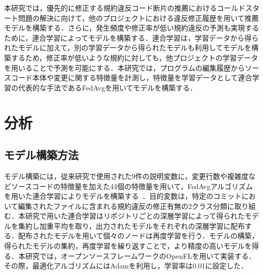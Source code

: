 \documentclass[uplatex,dvipdfmx,a4paper,twocolumn,base=11pt,jbase=11pt,ja=standard]{bxjsarticle}  %
\newcommand{\todo}[1]{\colorbox{yellow}{{\bf TODO}:}{\color{red} {\textbf{[#1]}}}}
\begin{document}
本研究では，優先的に修正する規約違反コード断片の推薦におけるコールドスタート問題の解決に向けて，他のプロジェクトにおける違反修正履歴を用いて推薦モデルを構築する．さらに，発生頻度や修正率が低い規約違反の予測も実現するために，連合学習によってモデルを構築する．連合学習は，学習データから得られたモデルに加えて，別の学習データから得られたモデルも利用してモデルを構築するため，修正率が低いような規約に対しても，他プロジェクトの学習データを用いることで予測を可能にする．本研究では，プログラムの編集履歴からソースコード本体や変更に関する特徴量を計測し，特徴量を学習データとして連合学習の代表的な手法であるFedAvgを用いてモデルを構築する．


\section{分析}

\subsection{モデル構築方法}
モデル構築には，従来研究で使用された9件の説明変数に，変更行数や複雑度などソースコードの特徴量を加えた44個の特徴量を用いて，FedAvgアルゴリズムを用いた連合学習によりモデルを構築する~\cite{article2}．目的変数は，特定のコミットにおいて編集されたファイルに含まれる規約違反の修正有無の2クラス分類に取り組む．本研究で用いた連合学習はリポジトリごとの深層学習によって得られたモデルを集約し加重平均を取り，出力されたモデルをそれぞれの深層学習に配布する．配布されたモデルを用いて個々のノードは再度学習を行う．モデルの構築，得られたモデルの集約，再度学習を繰り返すことで，より精度の高いモデルを得る．本研究では，オープンソースフレームワークのOpenFLを用いて実装する．その際，最適化アルゴリズムにはAdamを利用し，学習率は0.01に設定した．

\end{document}
